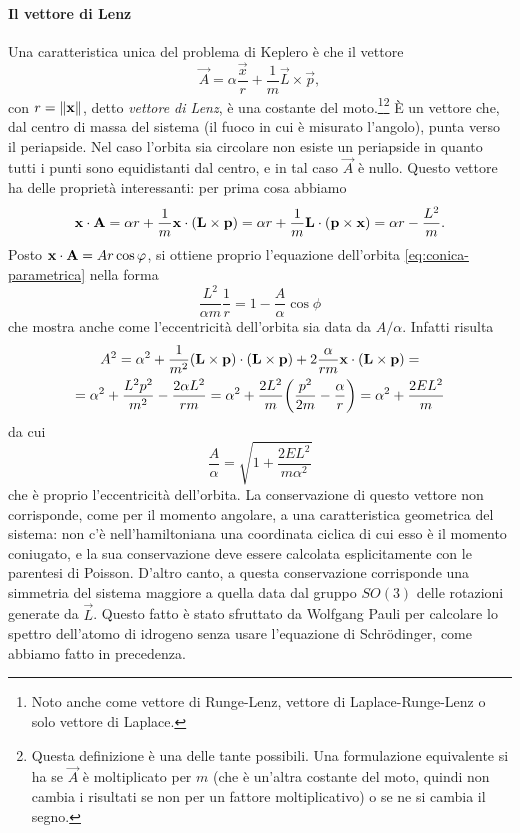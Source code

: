 \paragraph{Il vettore di Lenz}
Una caratteristica unica del problema di Keplero è che il vettore
\begin{equation}
	\vec A=\alpha\frac{\vec x}{r}+\frac1{m}\vec L\times\vec p,
	\label{eq:vettore-runge-lenz}
\end{equation}
con $r=\left\|{\mathbf{x}}\right\|$, detto \emph{vettore di Lenz}, è una costante del moto.\footnote{Noto anche come vettore di Runge-Lenz, vettore di Laplace-Runge-Lenz o solo vettore di Laplace.}\footnote{Questa definizione è una delle tante possibili. Una formulazione equivalente si ha se $\vec A$ è moltiplicato per $m$ (che è un'altra costante del moto, quindi non cambia i risultati se non per un fattore moltiplicativo) o se ne si cambia il segno.}
È un vettore che, dal centro di massa del sistema (il fuoco in cui è misurato l'angolo), punta verso il periapside.
Nel caso l'orbita sia circolare non esiste un periapside in quanto tutti i punti sono equidistanti dal centro, e in tal caso $\vec A$ è nullo.
Questo vettore ha delle proprietà interessanti: per prima cosa abbiamo
\begin{equation}
	{\mathbf{x}}\cdot{\mathbf{A}}=\alpha r+\frac1{m}{\mathbf{x}}\cdot{(\mathbf{L}\times\mathbf{p})}=\alpha r+\frac1{m}{\mathbf{L}}\cdot{(\mathbf{p}\times\mathbf{x})}=\alpha r-\frac{L^2}{m}.
\end{equation}
Posto ${\mathbf{x}}\cdot{\mathbf{A}}=Ar\cos\varphi$, si ottiene proprio l'equazione dell'orbita \eqref{eq:conica-parametrica} nella forma
\begin{equation}
	\frac{L^2}{\alpha m}\frac1{r}=1-\frac{A}{\alpha}\cos\phi
	\label{eq:orbita-keplero-vettore-lenz}
\end{equation}
che mostra anche come l'eccentricità dell'orbita sia data da $A/\alpha$.
Infatti risulta
\begin{multline}
	A^2=\alpha^2+\frac1{m^2}{(\mathbf{L}\times\mathbf{p})}\cdot{(\mathbf{L}\times\mathbf{p})}+2\frac{\alpha}{rm}{\mathbf{x}}\cdot{(\mathbf{L}\times\mathbf{p})}=\\
	=\alpha^2+\frac{L^2p^2}{m^2}-\frac{2\alpha L^2}{rm}=\alpha^2+\frac{2L^2}{m}\bigg(\frac{p^2}{2m}-\frac{\alpha}{r}\bigg)=\alpha^2+\frac{2EL^2}{m}
\end{multline}
da cui
\begin{equation}
	\frac{A}{\alpha}=\sqrt{1+\frac{2EL^2}{m\alpha^2}}
\end{equation}
che è proprio l'eccentricità dell'orbita.
La conservazione di questo vettore non corrisponde, come per il momento angolare, a una caratteristica geometrica del sistema: non c'è nell'hamiltoniana una coordinata ciclica di cui esso è il momento coniugato, e la sua conservazione deve essere calcolata esplicitamente con le parentesi di Poisson.
D'altro canto, a questa conservazione corrisponde una simmetria del sistema maggiore a quella data dal gruppo $SO(3)$ delle rotazioni generate da $\vec L$.
Questo fatto è stato sfruttato da Wolfgang Pauli per calcolare lo spettro dell'atomo di idrogeno senza usare l'equazione di Schr\"odinger, come abbiamo fatto in precedenza.

